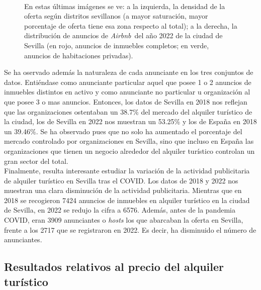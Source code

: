 \documentclass[a4paper,10pt]{article}
\newcommand*{\airbnb}{\textit{Airbnb}}
\begin{document}
\begin{figure}[ht]
                \hfill \\
                En estas últimas imágenes se ve: a la izquierda, la densidad de la oferta según distritos sevillanos (a mayor saturación, mayor
                porcentaje de oferta tiene esa zona respecto al total); a la derecha, la distribución de anuncios de \airbnb \ del año 2022
                de la ciudad de Sevilla (en rojo, anuncios de inmuebles completos; en verde, anuncios de habitaciones privadas).

            \end{figure}

            Se ha oservado además la naturaleza de cada anunciante en los tres conjuntos de datos. Entiéndase como anunciante particular 
            aquel que posee 1 o 2 anuncios de inmuebles distintos en activo y como anunciante no particular u organización al que posee 3 o mas 
            anuncios. Entonces, los datos de Sevilla en 2018 nos reflejan que las organizaciones ostentaban un 38.7\% del mercado del alquiler turístico de 
            la ciudad, los de Sevilla en 2022 nos muestran un 53.25\% y los de España en 2018 un 39.46\%. Se ha observado pues que no solo ha aumentado
            el porcentaje del mercado controlado por organizaciones en Sevilla, sino que incluso en España las organizaciones que tienen un negocio
            alrededor del alquiler turístico controlan un gran sector del total. \\ 

            Finalmente, resulta interesante estudiar la variación de la actividad publicitaria de alquiler turístico en Sevilla tras el COVID.
            Los datos de 2018 y 2022 nos muestran una clara disminución de la actividad publicitaria. Mientras que en 2018 se recogieron 
            7424 anuncios de inmuebles en alquiler turístico en la ciudad de Sevilla, en 2022 se redujo la cifra a 6576. Además, 
            antes de la pandemia COVID, eran 3909 anunciantes o \textit{hosts} los que abarcaban la oferta en Sevilla, frente a los 2717 que
            se registraron en 2022. Es decir, ha disminuido el número de anunciantes.

        \clearpage

        \subsection{Resultados relativos al precio del alquiler turístico}
\end{document}
